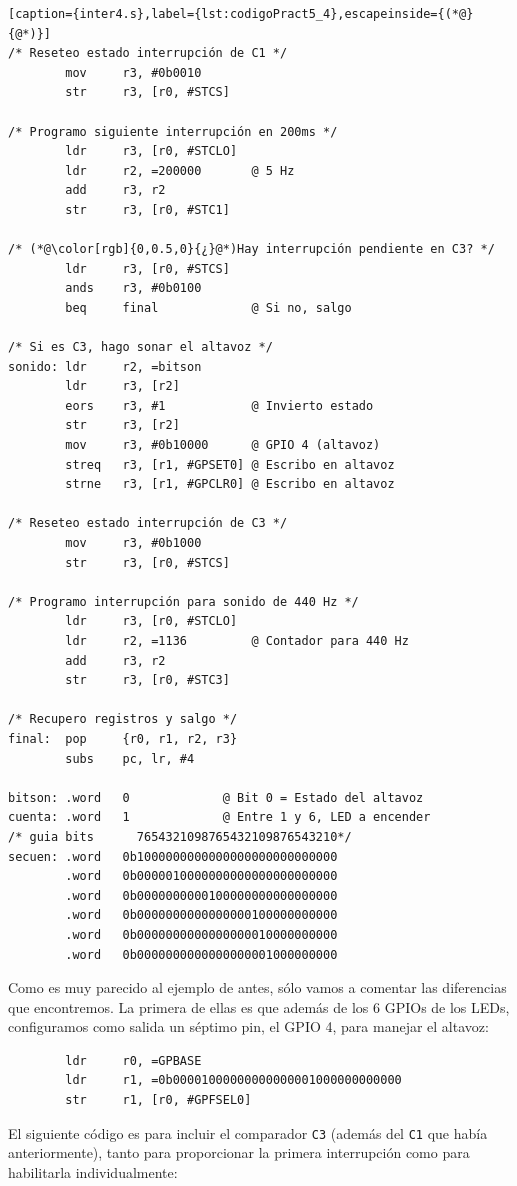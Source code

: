 \begin{lstlisting}[caption={inter4.s},label={lst:codigoPract5_4},escapeinside={(*@}{@*)}]
/* Reseteo estado interrupción de C1 */
        mov     r3, #0b0010
        str     r3, [r0, #STCS]

/* Programo siguiente interrupción en 200ms */
        ldr     r3, [r0, #STCLO]
        ldr     r2, =200000       @ 5 Hz
        add     r3, r2
        str     r3, [r0, #STC1]

/* (*@\color[rgb]{0,0.5,0}{¿}@*)Hay interrupción pendiente en C3? */
        ldr     r3, [r0, #STCS]
        ands    r3, #0b0100
        beq     final             @ Si no, salgo

/* Si es C3, hago sonar el altavoz */
sonido: ldr     r2, =bitson
        ldr     r3, [r2]
        eors    r3, #1            @ Invierto estado
        str     r3, [r2]
        mov     r3, #0b10000      @ GPIO 4 (altavoz)
        streq   r3, [r1, #GPSET0] @ Escribo en altavoz
        strne   r3, [r1, #GPCLR0] @ Escribo en altavoz

/* Reseteo estado interrupción de C3 */
        mov     r3, #0b1000
        str     r3, [r0, #STCS]

/* Programo interrupción para sonido de 440 Hz */
        ldr     r3, [r0, #STCLO]
        ldr     r2, =1136         @ Contador para 440 Hz
        add     r3, r2
        str     r3, [r0, #STC3]

/* Recupero registros y salgo */
final:  pop     {r0, r1, r2, r3}
        subs    pc, lr, #4

bitson: .word   0             @ Bit 0 = Estado del altavoz
cuenta: .word   1             @ Entre 1 y 6, LED a encender
/* guia bits      7654321098765432109876543210*/
secuen: .word   0b1000000000000000000000000000
        .word   0b0000010000000000000000000000
        .word   0b0000000000100000000000000000
        .word   0b0000000000000000100000000000
        .word   0b0000000000000000010000000000
        .word   0b0000000000000000001000000000
\end{lstlisting}

Como es muy parecido al ejemplo de antes, sólo vamos a comentar las diferencias que encontremos.
La primera de ellas es que además de los 6 GPIOs de los LEDs, configuramos como salida un séptimo
pin, el GPIO 4, para manejar el altavoz:

\begin{lstlisting}
        ldr     r0, =GPBASE
        ldr     r1, =0b00001000000000000001000000000000
        str     r1, [r0, #GPFSEL0]
\end{lstlisting}

El siguiente código es para incluir el comparador {\tt C3} (además del {\tt C1} que había
anteriormente), tanto para proporcionar la primera
interrupción como para habilitarla individualmente:

